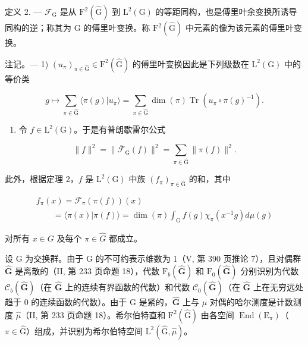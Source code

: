 定义 2. --- \(\mathcal{F}_{\mathrm{G}}\) 是从 \(\mathrm{F}^2 (\widehat{\mathrm{G}})\) 到 \(\mathrm{L}^2 (\mathrm{G})\) 的等距同构，也是傅里叶余变换所诱导同构的逆；称其为 G 的傅里叶变换。称 \(\mathrm{F}^2 (\widehat{\mathrm{G}})\) 中元素的像为该元素的傅里叶变换。

注记。--- 1) \((u_{\pi})_{\pi \in \widehat{\mathrm{G}}} \in \mathrm{F}^2(\widehat{\mathrm{G}})\) 的傅里叶变换因此是下列级数在 \(\mathrm{L}^2(\mathrm{G})\) 中的等价类

\[
g \mapsto \sum_ {\pi \in \widehat {\mathrm{G}}} \langle \pi (g) | u _ {\pi} \rangle = \sum_ {\pi \in \widehat {\mathrm{G}}} \dim (\pi) \operatorname{Tr} (u _ {\pi} \circ \pi (g) ^ {- 1}).
\]

\begin{enumerate}
\def\labelenumi{\arabic{enumi})}
\setcounter{enumi}{1}
\tightlist
\item
  令 \(f \in \mathrm{L}^2(\mathrm{G})\)。于是有普朗歇雷尔公式
\end{enumerate}

\[
\| f \| ^ {2} = \| \overline {{\mathcal {F}}} _ {\mathrm{G}} (f) \| ^ {2} = \sum_ {\pi \in \widehat {\mathrm{G}}} \| \pi (f) \| ^ {2}.
\]

此外，根据定理 2，\(f\) 是 \(\mathrm{L}^2 (\mathrm{G})\) 中族 \((f_{\pi})_{\pi \in \widehat{\mathrm{G}}}\) 的和，其中

\[
\begin{array}{l} f _ {\pi} (x) = \mathcal {F} _ {\pi} (\pi (f)) (x) \\ \qquad = \langle \pi (x) | \pi (f) \rangle = \dim (\pi) \int_ {\mathrm{G}} f (g) \chi_ {\pi} (x ^ {- 1} g) d \mu (g) \end{array}
\]

对所有 \(x \in G\) 及每个 \(\pi \in \widehat{G}\) 都成立。

设 G 为交换群。由于 G 的不可约表示维数为 1（V, 第 390 页推论 7），且对偶群 \(\widehat{\mathbf{G}}\) 是离散的（II, 第 233 页命题 18），代数 \(\mathrm{F}_b(\widehat{\mathbf{G}})\) 和 \(\mathrm{F}_0(\widehat{\mathbf{G}})\) 分别识别为代数 \(\mathcal{C}_b(\widehat{\mathbf{G}})\)（在 \(\widehat{\mathbf{G}}\) 上的连续有界函数的代数）和代数 \(\mathcal{C}_0(\widehat{\mathbf{G}})\)（在 \(\widehat{\mathbf{G}}\) 上在无穷远处趋于 0 的连续函数的代数）。由于 G 是紧的，\(\widehat{\mathbf{G}}\) 上与 \(\mu\) 对偶的哈尔测度是计数测度 \(\widehat{\mu}\)（II, 第 233 页命题 18）。希尔伯特直和 \(\mathrm{F}^2 (\widehat{\mathrm{G}})\) 由各空间 \(\operatorname{End}(\mathrm{E}_{\pi})\)（\(\pi \in \widehat{\mathrm{G}}\)）组成，并识别为希尔伯特空间 \(\mathrm{L}^2 (\widehat{\mathrm{G}},\widehat{\mu})\)。

